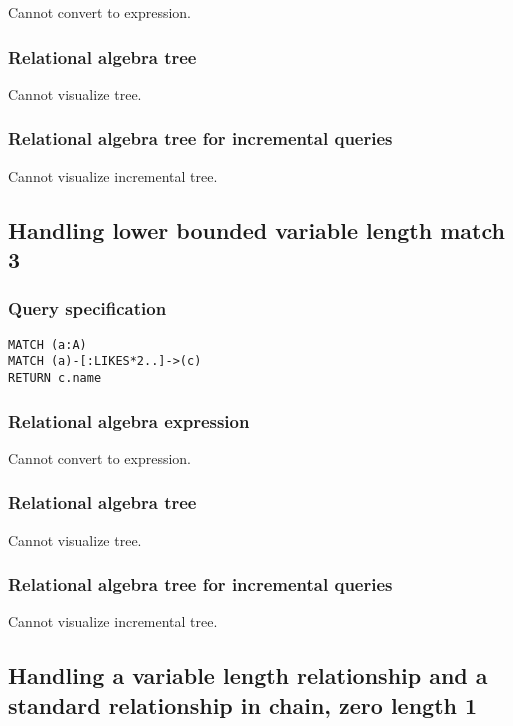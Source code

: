 Cannot convert to expression.

\subsubsection*{Relational algebra tree}

Cannot visualize tree.

\subsubsection*{Relational algebra tree for incremental queries}

Cannot visualize incremental tree.

\subsection{Handling lower bounded variable length match 3}

\subsubsection*{Query specification}

\begin{lstlisting}
MATCH (a:A)
MATCH (a)-[:LIKES*2..]->(c)
RETURN c.name
\end{lstlisting}

\subsubsection*{Relational algebra expression}

Cannot convert to expression.

\subsubsection*{Relational algebra tree}

Cannot visualize tree.

\subsubsection*{Relational algebra tree for incremental queries}

Cannot visualize incremental tree.

\subsection{Handling a variable length relationship and a standard relationship in chain, zero length 1}

